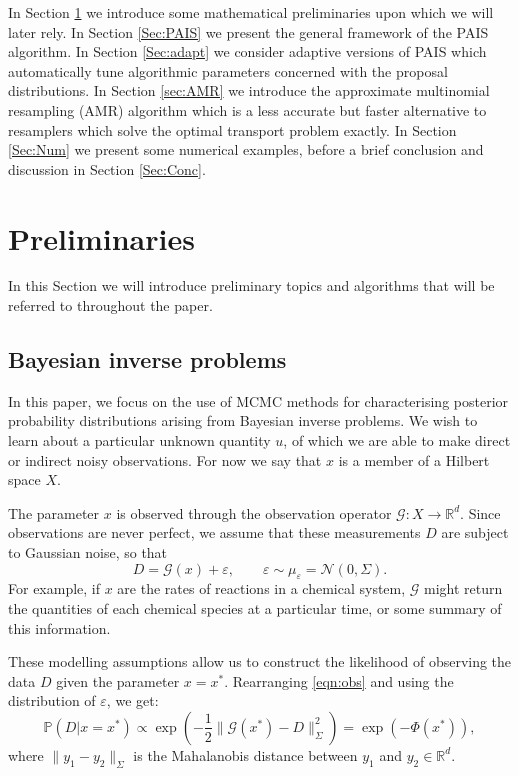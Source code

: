 \documentclass[final]{siamltex}
\newcommand{\G}{\mathcal{G}}
\newcommand{\data}{D}
\begin{document}
In Section \ref{Sec:Prelim} we introduce some mathematical
preliminaries upon which we will later rely. In Section \ref{Sec:PAIS}
we present the general framework of the PAIS algorithm. In Section
\ref{Sec:adapt} we consider adaptive versions of PAIS which
automatically tune algorithmic parameters concerned with the proposal
distributions. In Section \ref{sec:AMR} we introduce the approximate
multinomial resampling (AMR) algorithm which is a less accurate but
faster alternative to resamplers which solve the optimal transport
problem exactly. In Section \ref{Sec:Num} we present some numerical
examples, before a brief conclusion and discussion in Section
\ref{Sec:Conc}.

\section{Preliminaries}\label{Sec:Prelim}
In this Section we will introduce preliminary topics and algorithms
that will be referred to throughout the paper.
\subsection{Bayesian inverse problems}
In this paper, we focus on the use of MCMC methods for characterising
posterior probability distributions arising from Bayesian inverse problems. We
wish to learn about a particular unknown quantity $u$, of which we are
able to make direct or indirect noisy observations. For now
we say that $x$ is a member of a Hilbert
space $X$. 

The parameter $x$ is observed
through the observation operator $\mathcal{G}:X \to\mathbb{R}^d$. 
Since observations are never perfect, we
assume that these measurements $\data$ are subject to Gaussian noise,
so that
\begin{equation}\label{eqn:obs}
	\data = \mathcal{G}(x) + \varepsilon, \qquad \varepsilon \sim \mu_{\varepsilon} = \mathcal{N}(0,\Sigma).
\end{equation}
For example, if $x$ are the rates of reactions in a chemical system, $\G$ might
return the quantities of each chemical species at a particular time, or some
summary of this information.

These modelling assumptions allow us to construct the 
likelihood of observing the data $\data$ given the parameter $x =
x^*$. Rearranging \eqref{eqn:obs} and using the distribution of
$\varepsilon$, we get:
\begin{equation}\label{eqn:like}
	\mathbb{P}(\data|x=x^*) \propto \exp \left ( -\frac{1}{2} \|\mathcal{G}(x^*)
	  - \data\|_\Sigma^2 \right ) = \exp\left(-\Phi(x^*)\right),
\end{equation}
where $\| y_1 - y_2 \|_\Sigma$ is the Mahalanobis distance between $y_1$ and $y_2 \in \mathbb{R}^d$.
\end{document}
